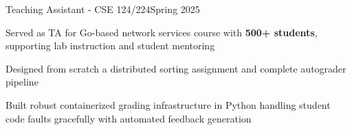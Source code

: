\begin{joblong}{Teaching Assistant - CSE 124/224}{Spring 2025}
	\item Served as TA for Go-based network services course with \textbf{500+ students}, supporting lab instruction and student mentoring
	\item Designed from scratch a distributed sorting assignment and complete autograder pipeline
	\item Built robust containerized grading infrastructure in Python handling student code faults gracefully with automated feedback generation
\end{joblong}